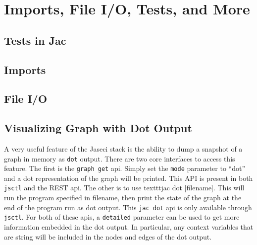 \chapter{Imports, File I/O, Tests, and More}
\minitoc


\section{Tests in Jac}

\par
{}
\par
{}


\section{Imports}

\par
{}
\par
{}

\section{File I/O}

\par
{}

\par
\section{Visualizing Graph with Dot Output}

A very useful feature of the Jaseci stack is the ability to dump a snapshot of a graph in memory as \texttt{dot} output. There are two core interfaces to access this feature.  The first is the \texttt{graph get} api. Simply set the \texttt{mode} parameter to ``dot'' and a dot representation of the graph will be printed. This API is present in both \texttt{jsctl} and the REST api. The other is to use texttt{jac dot [filename]}. This will run the program specified in filename, then print the state of the graph at the end of the program run as dot output. This \texttt{jac dot} api is only available through \texttt{jsctl}. For both of these apis, a \texttt{detailed} parameter can be used to get more information embedded in the dot output. In particular, any context variables that are string will be included in the nodes and edges of the dot output.
